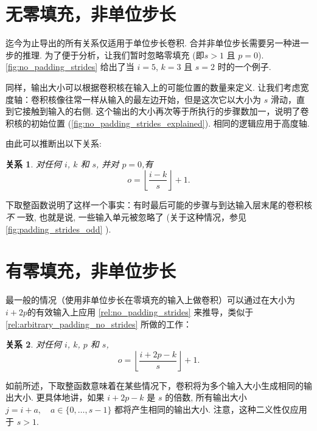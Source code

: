 \documentclass[notitlepage]{ctexrep}
\newtheorem{relationship}{关系}
\begin{document}
\section{无零填充，非单位步长}

迄今为止导出的所有关系仅适用于单位步长卷积. 合并非单位步长需要另一种进一步的推理. 为了便于分析，让我们暂时忽略零填充 (即$s > 1$
且 $p = 0$). \autoref{fig:no_padding_strides} 给出了当 $i =
5$, $k = 3$ 且 $s = 2$ 时的一个例子.

同样，输出大小可以根据卷积核在输入上的可能位置的数量来定义. 让我们考虑宽度轴：卷积核像往常一样从输入的最左边开始，但是这次它以大小为 $s$ 滑动，直到它接触到输入的右侧. 这个输出的大小再次等于所执行的步骤数加一，说明了卷积核的初始位置 
(\autoref{fig:no_padding_strides_explained}). 相同的逻辑应用于高度轴.

由此可以推断出以下关系:

\begin{relationship}\label{rel:no_padding_strides}
对任何 $i$, $k$ 和 $s$, 并对 $p = 0$,有
\begin{equation*}
    o = \left\lfloor \frac{i - k}{s} \right\rfloor + 1.
\end{equation*}
\end{relationship}

\noindent 下取整函数说明了这样一个事实：有时最后可能的步骤与到达输入层末尾的卷积核 {\em 不\/} 一致, 也就是说, 一些输入单元被忽略了 (关于这种情况，参见 \autoref{fig:padding_strides_odd} ).

\section{有零填充，非单位步长}

最一般的情况（使用非单位步长在零填充的输入上做卷积）可以通过在大小为$i + 2p$的有效输入上应用 \autoref{rel:no_padding_strides} 来推导，类似于 \autoref{rel:arbitrary_padding_no_strides} 所做的工作： 

\begin{relationship}\label{rel:padding_strides}
对任何 $i$, $k$, $p$ 和 $s$,
\begin{equation*}
    o = \left\lfloor \frac{i + 2p - k}{s} \right\rfloor + 1.
\end{equation*}
\end{relationship}

\noindent 如前所述，下取整函数意味着在某些情况下，卷积将为多个输入大小生成相同的输出大小. 更具体地讲，如果 $i + 2p - k$ 是 $s$ 的倍数, 所有输出大小 $j = i + a, \quad a
\in \{0,\ldots,s - 1\}$ 都将产生相同的输出大小. 注意，这种二义性仅应用于 $s > 1$.
\end{document}

